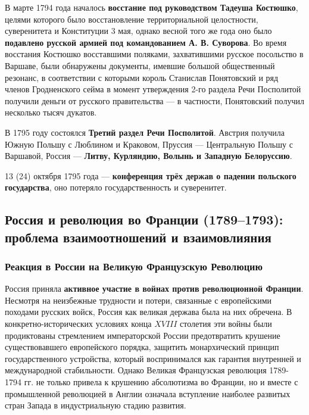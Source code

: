 \documentclass{article}
\begin{document}
В марте 1794 года началось \textbf{восстание под руководством Тадеуша Костюшко}, целями которого было восстановление территориальной целостности, суверенитета и Конституции 3 мая, однако весной того же года оно было \textbf{подавлено русской армией под командованием А. В. Суворова}. Во время восстания Костюшко восставшими поляками, захватившими русское посольство в Варшаве, были обнаружены документы, имевшие большой общественный резонанс, в соответствии с которыми король Станислав Понятовский и ряд членов Гродненского сейма в момент утверждения 2-го раздела Речи Посполитой получили деньги от русского правительства — в частности, Понятовский получил несколько тысяч дукатов.

\hfill

В 1795 году состоялся \textbf{Третий раздел Речи Посполитой}. Австрия получила Южную Польшу с Люблином и Краковом, Пруссия — Центральную Польшу с Варшавой, Россия — \textbf{Литву, Курляндию, Волынь и Западную Белоруссию}.

13 (24) октября 1795 года — \textbf{конференция трёх держав о падении польского государства}, оно потеряло государственность и суверенитет. 

\pagebreak
\subsection{Россия и революция во Франции (1789–1793): проблема взаимоотношений и взаимовлияния}

\subsubsection{Реакция в России на Великую Французскую Революцию}

Россия приняла \textbf{активное участие в войнах против революционной Франции}. Несмотря на неизбежные трудности и потери, связанные с европейскими походами русских войск, Россия как великая держава была на них обречена. В конкретно-исторических условиях конца $XVIII$ столетия эти войны были продиктованы стремлением императорской России предотвратить крушение существовавшего европейского порядка, защитить монархический принцип государственного устройства, который воспринимался как гарантия внутренней и международной стабильности. Однако Великая Французская революция 1789-1794 гг. не только привела к крушению абсолютизма во Франции, но и вместе с промышленной революцией в Англии означала вступление наиболее развитых стран Запада в индустриальную стадию развития.
\end{document}
